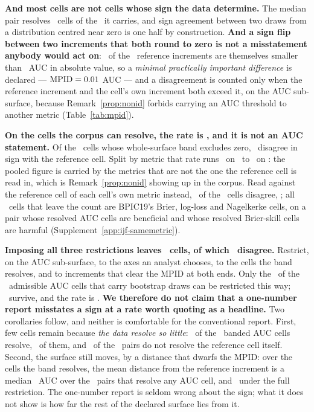 \documentclass[11pt,3p,review,authoryear]{elsarticle}
\theoremstyle{definition}
\begin{document}
\textbf{And most cells are not cells whose sign the data determine.} The
median pair resolves \nResolvedMedian\ cells of the \nCellsPerPairMedian\ it
carries, and sign agreement between two draws from a distribution centred
near zero is one half by construction. \textbf{And a sign flip between two
increments that both round to zero is not a misstatement anybody would act
on}: \nRefBelowMpid\ of the \nPairs\ reference increments are themselves
smaller than \mpidAuc\ AUC in absolute value, so a \emph{minimal practically important
difference} is declared --- $\mathrm{MPID} = 0.01$ AUC --- and a
disagreement is counted only when the reference increment and the cell's own
increment both exceed it, on the AUC sub-surface, because Remark~\ref{prop:nonid}
forbids carrying an AUC threshold to another metric
(Table~\ref{tab:mpid}).

\textbf{On the cells the corpus can resolve, the rate is
\misreportPooledResolvedPct, and it is not an AUC statement.} Of the
\nResolvedCorpus\ cells whose whole-surface band excludes
zero, \nDisagreeResolved\ disagree in sign with the reference cell. Split by
metric that rate runs \misreportResolvedInstrumentMinPct\ on
\instrumentLeastDisagreement\ to \misreportResolvedInstrumentMaxPct\ on
\instrumentMostDisagreement: the pooled figure is carried by the metrics
that are not the one the reference cell is read in, which is
Remark~\ref{prop:nonid} showing up in the corpus. Read against the reference
cell of each cell's own metric instead, \nDisagreeOwnMetric\ of the
\nResolvedCorpus\ cells disagree, \misreportOwnMetricPct; all
\nLeaveBpicNineteenProper\ cells that leave the count are BPIC19's Brier,
log-loss and Nagelkerke cells, on a pair whose resolved AUC cells are beneficial and
whose resolved Brier-skill cells are harmful
(Supplement~\ref{app:ijf-samemetric}).

\textbf{Imposing all three restrictions leaves \nCellsFullyRestricted\ cells,
of which \nDisagreeFullyRestricted\ disagree.} Restrict, on the AUC
sub-surface, to the axes an analyst chooses, to the cells the band resolves,
and to increments that clear the MPID at both ends. Only the
\nInferenceCells\ of the \nCellsAuc\ admissible AUC cells that carry
bootstrap draws can be restricted this way; \nCellsFullyRestricted\ survive,
and the rate is \misreportFullyRestrictedPct. \textbf{We therefore do not
claim that a one-number report misstates a sign at a rate worth quoting as a
headline.} Two corollaries follow, and neither is comfortable for the
conventional report. First, few cells remain because \emph{the data resolve
so little}: \nCellsResolvedAuc\ of the \nInferenceCells\ banded AUC cells
resolve, \shareResolvedAucPct\ of them, and \nRefUnresolvedCell\ of the
\nPairs\ pairs do not resolve the reference cell itself. Second, the surface
still moves, by a distance that dwarfs the MPID: over the cells the band
resolves, the mean distance from the reference increment is a median
\madResolvedMedian\ AUC over the \nPairsMadResolved\ pairs that resolve any AUC
cell, and \madFullyRestrictedMedian\ under the full restriction. The
one-number report is seldom wrong about the sign; what it does not show is
how far the rest of the declared surface lies from it.
\end{document}
